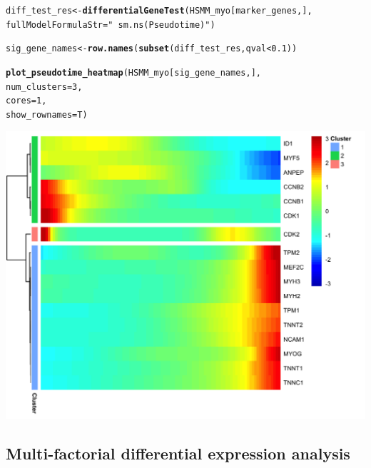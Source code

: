 \documentclass[10pt,oneside]{article}\usepackage[]{graphicx}\usepackage[]{color}
\makeatletter
\def\maxwidth{ %
  \ifdim\Gin@nat@width>\linewidth
    \linewidth
  \else
    \Gin@nat@width
  \fi
}
\newcommand{\hlnum}[1]{\textcolor[rgb]{0.686,0.059,0.569}{#1}}%
\newcommand{\hlstr}[1]{\textcolor[rgb]{0.192,0.494,0.8}{#1}}%
\newcommand{\hlopt}[1]{\textcolor[rgb]{0,0,0}{#1}}%
\newcommand{\hlstd}[1]{\textcolor[rgb]{0.345,0.345,0.345}{#1}}%
\newcommand{\hlkwb}[1]{\textcolor[rgb]{0.69,0.353,0.396}{#1}}%
\newcommand{\hlkwc}[1]{\textcolor[rgb]{0.333,0.667,0.333}{#1}}%
\newcommand{\hlkwd}[1]{\textcolor[rgb]{0.737,0.353,0.396}{\textbf{#1}}}%
\newenvironment{kframe}{%
 \def\at@end@of@kframe{}%
 \ifinner\ifhmode%
  \def\at@end@of@kframe{\end{minipage}}%
  \begin{minipage}{\columnwidth}%
 \fi\fi%
 \def\FrameCommand##1{\hskip\@totalleftmargin \hskip-\fboxsep
 \colorbox{shadecolor}{##1}\hskip-\fboxsep
     \hskip-\linewidth \hskip-\@totalleftmargin \hskip\columnwidth}%
 \MakeFramed {\advance\hsize-\width
   \@totalleftmargin\z@ \linewidth\hsize
   \@setminipage}}%
 {\par\unskip\endMakeFramed%
 \at@end@of@kframe}
\newenvironment{knitrout}{}{} %
\makeatother
\begin{document}
\begin{knitrout}
\color{fgcolor}\begin{kframe}
\begin{alltt}
\hlstd{diff_test_res} \hlkwb{<-} \hlkwd{differentialGeneTest}\hlstd{(HSMM_myo[marker_genes,],}
                                      \hlkwc{fullModelFormulaStr}\hlstd{=}\hlstr{"~sm.ns(Pseudotime)"}\hlstd{)}

\hlstd{sig_gene_names} \hlkwb{<-} \hlkwd{row.names}\hlstd{(}\hlkwd{subset}\hlstd{(diff_test_res, qval} \hlopt{<} \hlnum{0.1}\hlstd{))}


\hlkwd{plot_pseudotime_heatmap}\hlstd{(HSMM_myo[sig_gene_names,],}
                        \hlkwc{num_clusters} \hlstd{=} \hlnum{3}\hlstd{,}
                        \hlkwc{cores} \hlstd{=} \hlnum{1}\hlstd{,}
                        \hlkwc{show_rownames} \hlstd{= T)}
\end{alltt}
\end{kframe}

{\centering \includegraphics[width=\maxwidth]{figure/plot_diff_res_pt_heatmap-1} 

}



\end{knitrout}

\subsection{Multi-factorial differential expression analysis}
\end{document}
